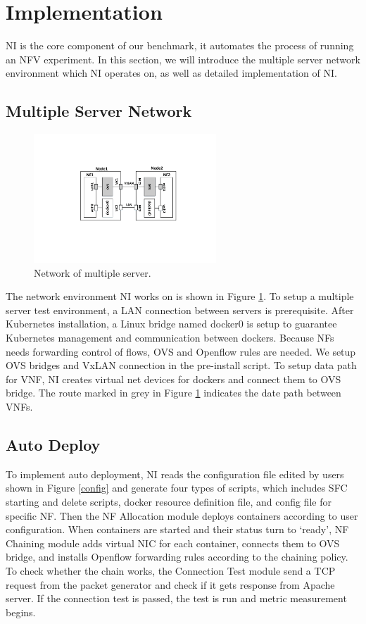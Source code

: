 \section{Implementation}
NI is the core component of our benchmark,
it automates the process of running an NFV experiment.
In this section, we will introduce the multiple server network environment
which NI operates on,
as well as detailed implementation of NI.

\subsection{Multiple Server Network}

\begin{figure}[!t]
\centering
\includegraphics[width=2.7in]{fig/network.pdf}
\caption{Network of multiple server.}
\label{network}
\end{figure}

The network environment NI works on is shown in Figure \ref{network}. 
To setup a multiple server test environment, 
a LAN connection between servers is prerequisite. 
After Kubernetes installation, a Linux bridge named docker0 is setup 
to guarantee Kubernetes management and communication between dockers.
Because NFs needs forwarding control of flows, 
OVS and Openflow rules are needed. 
We setup OVS bridges and VxLAN connection in the pre-install script.
To setup data path for VNF, NI creates virtual net devices for dockers 
and  connect them to OVS bridge. 
The route marked in grey in Figure \ref{network} indicates the 
date path between VNFs.

\subsection{Auto Deploy}
To implement auto deployment, 
NI reads the configuration file edited by users shown in Figure \ref{config} 
and generate four types of scripts,
which includes SFC starting and delete scripts, 
docker resource definition file, and config file for specific NF.
Then the NF Allocation module deploys containers according to user configuration.
When containers are started and their status turn to `ready',
NF Chaining module adds virtual NIC for each container,
connects them to OVS bridge,
and installs Openflow forwarding rules according to the chaining policy.
To check whether the chain works,
the Connection Test module send a TCP request
from the packet generator and check if it gets response from Apache server.
If the connection test is passed,
the test is run and metric measurement begins.







